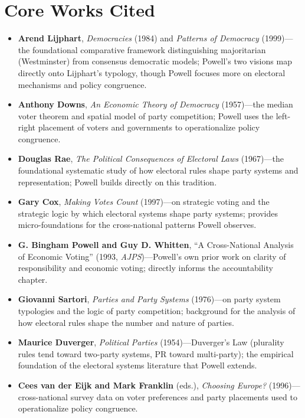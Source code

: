 \documentclass[12pt]{article}
\begin{document}
\section{Core Works Cited}

\begin{itemize}[leftmargin=*, itemsep=4pt]
    \item \textbf{Arend Lijphart}, \textit{Democracies} (1984) and \textit{Patterns of Democracy} (1999)---the foundational comparative framework distinguishing majoritarian (Westminster) from consensus democratic models; Powell's two visions map directly onto Lijphart's typology, though Powell focuses more on electoral mechanisms and policy congruence.
    \item \textbf{Anthony Downs}, \textit{An Economic Theory of Democracy} (1957)---the median voter theorem and spatial model of party competition; Powell uses the left-right placement of voters and governments to operationalize policy congruence.
    \item \textbf{Douglas Rae}, \textit{The Political Consequences of Electoral Laws} (1967)---the foundational systematic study of how electoral rules shape party systems and representation; Powell builds directly on this tradition.
    \item \textbf{Gary Cox}, \textit{Making Votes Count} (1997)---on strategic voting and the strategic logic by which electoral systems shape party systems; provides micro-foundations for the cross-national patterns Powell observes.
    \item \textbf{G. Bingham Powell and Guy D. Whitten}, ``A Cross-National Analysis of Economic Voting'' (1993, \textit{AJPS})---Powell's own prior work on clarity of responsibility and economic voting; directly informs the accountability chapter.
    \item \textbf{Giovanni Sartori}, \textit{Parties and Party Systems} (1976)---on party system typologies and the logic of party competition; background for the analysis of how electoral rules shape the number and nature of parties.
    \item \textbf{Maurice Duverger}, \textit{Political Parties} (1954)---Duverger's Law (plurality rules tend toward two-party systems, PR toward multi-party); the empirical foundation of the electoral systems literature that Powell extends.
    \item \textbf{Cees van der Eijk and Mark Franklin} (eds.), \textit{Choosing Europe?} (1996)---cross-national survey data on voter preferences and party placements used to operationalize policy congruence.

\end{itemize}
\end{document}
